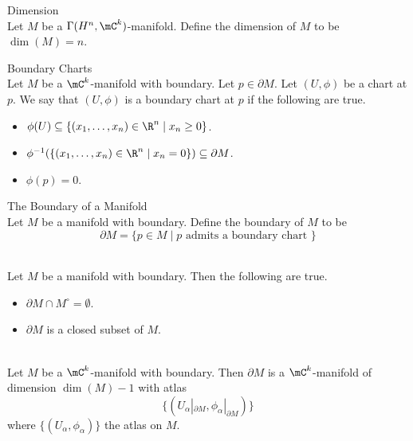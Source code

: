 \documentclass[a4paper]{article}
\begin{document}
\begin{defn}{Dimension}{}\\
Let $M$ be a $\Gamma(H^n,\mC^k)$-manifold. Define the dimension of $M$ to be $\dim(M)=n$. 
\end{defn}

\begin{defn}{Boundary Charts}{}\\
Let $M$ be a $\mC^k$-manifold with boundary. Let $p\in\partial M$. Let $(U,\phi)$ be a chart at $p$. We say that $(U,\phi)$ is a boundary chart at $p$ if the following are true. 
\begin{itemize}
\item $\phi(U)\subseteq\{(x_1,\dots,x_n)\in\R^n\;|\;x_n\geq 0\}$. 
\item $\phi^{-1}(\{(x_1,\dots,x_n)\in\R^n\;|\;x_n=0\})\subseteq\partial M$. 
\item $\phi(p)=0$. 
\end{itemize}
\end{defn}

\begin{defn}{The Boundary of a Manifold}{}\\
Let $M$ be a manifold with boundary. Define the boundary of $M$ to be $$\partial M=\{p\in M\;|\;p\text{ admits a boundary chart }\}$$
\end{defn}

\begin{lmm}{}{}\\
Let $M$ be a manifold with boundary. Then the following are true. 
\begin{itemize}
\item $\partial M\cap M^\circ=\emptyset$. 
\item $\partial M$ is a closed subset of $M$. 
\end{itemize}
\end{lmm}

\begin{prp}{}{}\\
Let $M$ be a $\mC^k$-manifold with boundary. Then $\partial M$ is a $\mC^k$-manifold of dimension $\dim(M)-1$ with atlas $$\{(U_\alpha|_{\partial M},\phi_\alpha|_{\partial M})\}$$ where $\{(U_\alpha,\phi_\alpha)\}$ the atlas on $M$. 
\end{prp}
\end{document}
